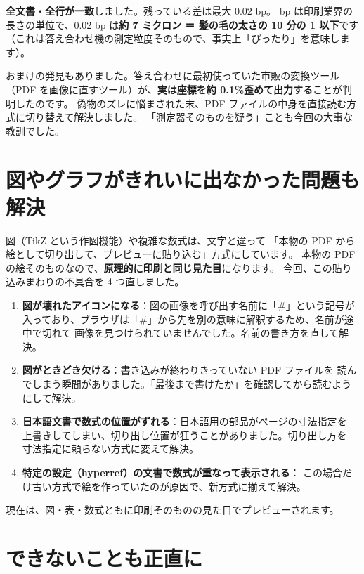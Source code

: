 \documentclass[11pt,a4paper]{ltjsarticle}
\begin{document}
\textbf{全文書・全行が一致}しました。残っている差は最大 0.02 bp。
bp は印刷業界の長さの単位で、0.02 bp は\textbf{約 7 ミクロン ＝ 髪の毛の太さの 10 分の 1 以下}です
（これは答え合わせ機の測定粒度そのもので、事実上「ぴったり」を意味します）。

おまけの発見もありました。答え合わせに最初使っていた市販の変換ツール
（PDF を画像に直すツール）が、\textbf{実は座標を約 0.1\%歪めて出力する}ことが判明したのです。
偽物のズレに悩まされた末、PDF ファイルの中身を直接読む方式に切り替えて解決しました。
「測定器そのものを疑う」ことも今回の大事な教訓でした。

\section{図やグラフがきれいに出なかった問題も解決}

図（TikZ という作図機能）や複雑な数式は、文字と違って
「本物の PDF から絵として切り出して、プレビューに貼り込む」方式にしています。
本物の PDF の絵そのものなので、\textbf{原理的に印刷と同じ見た目}になります。
今回、この貼り込みまわりの不具合を 4 つ直しました。

\begin{enumerate}
\item \textbf{図が壊れたアイコンになる}：図の画像を呼び出す名前に「\#」という記号が
  入っており、ブラウザは「\#」から先を別の意味に解釈するため、名前が途中で切れて
  画像を見つけられていませんでした。名前の書き方を直して解決。
\item \textbf{図がときどき欠ける}：書き込みが終わりきっていない PDF ファイルを
  読んでしまう瞬間がありました。「最後まで書けたか」を確認してから読むようにして解決。
\item \textbf{日本語文書で数式の位置がずれる}：日本語用の部品がページの寸法指定を
  上書きしてしまい、切り出し位置が狂うことがありました。切り出し方を
  寸法指定に頼らない方式に変えて解決。
\item \textbf{特定の設定（hyperref）の文書で数式が重なって表示される}：
  この場合だけ古い方式で絵を作っていたのが原因で、新方式に揃えて解決。
\end{enumerate}

現在は、図・表・数式ともに印刷そのものの見た目でプレビューされます。

\section{できないことも正直に}
\end{document}
